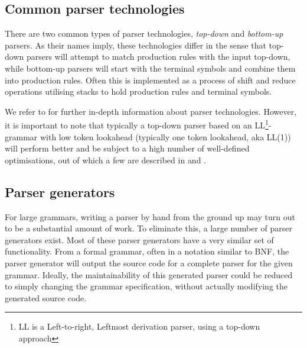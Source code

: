 \subsection{Common parser technologies}
There are two common types of parser technologies, \textit{top-down} and
\textit{bottom-up} parsers. As their names imply, these technologies differ in
the sense that top-down parsers will attempt to match production rules with the
input top-down, while bottom-up parsers will start with the terminal symbols and combine them into production
rules. Often this is implemented as a process of shift and reduce operations utilising stacks to hold
production rules and terminal symbols.

We refer to \cite{compiler_tech} for further in-depth information about parser
technologies. However, it is important to note that typically a top-down parser
based on an LL\footnote{LL is a Left-to-right, Leftmost derivation
parser, using a top-down approach}-grammar with low token lookahead (typically
one token lookahead, aka LL(1)) will perform better and be subject to a high
number of well-defined optimisations, out of which a few are described in
\cite{compiler_tech} and \cite{DBLP:books/cu/Appel1998c}.

\subsection{Parser generators}
For large grammars, writing a parser by hand from the ground up may turn out to
be a substantial amount of work. To eliminate this, a large number of
parser generators exist. Most of these parser generators have a very
similar set of functionality. From a formal grammar, often in a notation
similar to BNF, the parser generator will output the source code for a
complete parser for the given grammar. Ideally, the maintainability of this
generated parser could be reduced to simply changing the grammar specification,
without actually modifying the generated source code.

